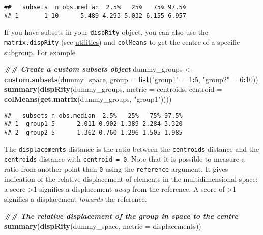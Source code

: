 \documentclass[
]{book}
\newenvironment{Shaded}{\begin{snugshade}}{\end{snugshade}}
\newcommand{\AttributeTok}[1]{\textcolor[rgb]{0.13,0.29,0.53}{#1}}
\newcommand{\DecValTok}[1]{\textcolor[rgb]{0.00,0.00,0.81}{#1}}
\newcommand{\DocumentationTok}[1]{\textcolor[rgb]{0.56,0.35,0.01}{\textbf{\textit{#1}}}}
\newcommand{\FunctionTok}[1]{\textcolor[rgb]{0.13,0.29,0.53}{\textbf{#1}}}
\newcommand{\NormalTok}[1]{#1}
\newcommand{\OtherTok}[1]{\textcolor[rgb]{0.56,0.35,0.01}{#1}}
\newcommand{\SpecialCharTok}[1]{\textcolor[rgb]{0.81,0.36,0.00}{\textbf{#1}}}
\newcommand{\StringTok}[1]{\textcolor[rgb]{0.31,0.60,0.02}{#1}}
\begin{document}
\begin{verbatim}
##   subsets  n obs.median  2.5%   25%   75% 97.5%
## 1       1 10      5.489 4.293 5.032 6.155 6.957
\end{verbatim}

If you have subsets in your \texttt{dispRity} object, you can also use the \texttt{matrix.dispRity} (see \protect\hyperlink{utilities}{utilities}) and \texttt{colMeans} to get the centre of a specific subgroup.
For example

\begin{Shaded}
\begin{Highlighting}[]
\DocumentationTok{\#\# Create a custom subsets object}
\NormalTok{dummy\_groups }\OtherTok{\textless{}{-}} \FunctionTok{custom.subsets}\NormalTok{(dummy\_space,}
                               \AttributeTok{group =} \FunctionTok{list}\NormalTok{(}\StringTok{"group1"} \OtherTok{=} \DecValTok{1}\SpecialCharTok{:}\DecValTok{5}\NormalTok{,}
                                            \StringTok{"group2"} \OtherTok{=} \DecValTok{6}\SpecialCharTok{:}\DecValTok{10}\NormalTok{))}
\FunctionTok{summary}\NormalTok{(}\FunctionTok{dispRity}\NormalTok{(dummy\_groups, }\AttributeTok{metric =}\NormalTok{ centroids,}
    \AttributeTok{centroid =} \FunctionTok{colMeans}\NormalTok{(}\FunctionTok{get.matrix}\NormalTok{(dummy\_groups, }\StringTok{"group1"}\NormalTok{))))}
\end{Highlighting}
\end{Shaded}

\begin{verbatim}
##   subsets n obs.median  2.5%   25%   75% 97.5%
## 1  group1 5      2.011 0.902 1.389 2.284 3.320
## 2  group2 5      1.362 0.760 1.296 1.505 1.985
\end{verbatim}

The \texttt{displacements} distance is the ratio between the \texttt{centroids} distance and the \texttt{centroids} distance with \texttt{centroid\ =\ 0}.
Note that it is possible to measure a ratio from another point than \texttt{0} using the \texttt{reference} argument.
It gives indication of the relative displacement of elements in the multidimensional space: a score \textgreater1 signifies a displacement \emph{away} from the reference. A score of \textgreater1 signifies a displacement \emph{towards} the reference.

\begin{Shaded}
\begin{Highlighting}[]
\DocumentationTok{\#\# The relative displacement of the group in space to the centre}
\FunctionTok{summary}\NormalTok{(}\FunctionTok{dispRity}\NormalTok{(dummy\_space, }\AttributeTok{metric =}\NormalTok{ displacements))}
\end{Highlighting}
\end{Shaded}
\end{document}

